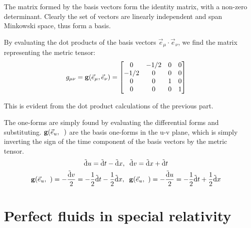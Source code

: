 \documentclass{report}
\begin{document}
\begin{subquests}
\begin{subquests}
		\item
		The matrix formed by the basis vectors form the identity matrix, with a non-zero determinant. Clearly the set of vectors are linearly independent and span Minkowski space,	thus form a basis.

		\item
		By evaluating the dot products of the basis vectors $\vec{e}_{\mu} \cdot \vec{e}_{\nu}$, we find the matrix representing the metric tensor:
		\begin{gather*}
			g_{\mu\nu} = {\vb g}\pqty{\vec{e}_{\mu},\vec{e}_{\nu}} =
			\mqty[
				0 & -1/2 & 0 & 0 \\
				-1/2 & 0 & 0 & 0 \\
				0 & 0 & 1 & 0 \\
				0 & 0 & 0 & 1			
			]
		\end{gather*}

		\item
		This is evident from the dot product calculations of the previous part.

		\item
		The one-forms are simply found by evaluating the differential forms and substituting. ${\vb g}(\vec{e}_u,\;\;)$ are the basis one-forms in the u-v plane, which is simply inverting the sign of the time component of the basis vectors by the metric tensor. 
		\begin{gather*}
			\tilde{\dd}u = \tilde{\dd}t - \tilde{\dd}x, \;\; \tilde{\dd}v = \tilde{\dd}x + \tilde{\dd}t	\\
			{\vb g}\pqty{\vec{e}_u, \;\;} = -\frac{\tilde{\dd}v}{2} = - \frac{1}{2}\tilde{\dd}t - \frac{1}{2}\tilde{\dd}x, \;\; {\vb g}\pqty{\vec{e}_u, \;\;} = - \frac{\tilde{\dd}u}{2} = -\frac{1}{2}\tilde{\dd}t + \frac{1}{2}\tilde{\dd}x
		\end{gather*}
	\end{subquests}
\end{subquests}

\chapter{Perfect fluids in special relativity}
\end{document}
